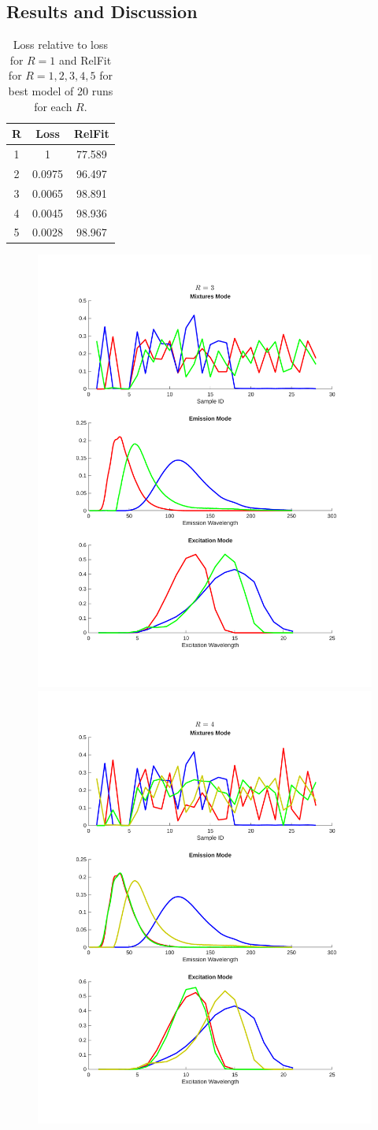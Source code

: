 \subsection*{Results and Discussion}

\begin{table}[H]
    \centering
    \begin{tabular}{|c|c|c|}
    \hline
    R & Loss & RelFit \\
    \hline
    1 & 1 & 77.589 \\
    \hline
    2 & 0.0975 & 96.497 \\
    \hline
    3 & 0.0065 & 98.891 \\
    \hline
    4 & 0.0045 & 98.936 \\
    \hline
    5 & 0.0028 & 98.967 \\
    \hline
    \end{tabular}
    \caption{Loss relative to loss for $R=1$ and RelFit for $R=1,2,3,4,5$ for best model of 20 runs for each $R$.}
    \label{tab:rank_choice}
\end{table}



\begin{figure}[H]
    \centering
    \includegraphics[trim = 2cm 2.5cm 2cm 1.9cm, clip, width=0.46\linewidth]{figures/factors_rank3.pdf}
    \includegraphics[trim = 2cm 2.5cm 2cm 1.9cm, clip, width=0.46\linewidth]{figures/factors_rank4.pdf}
    \caption{}
    \label{fig:plot_factors}
\end{figure}

